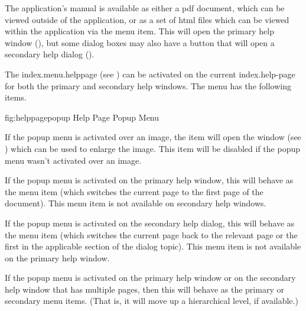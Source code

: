 
The application's manual is available as either a \gls{pdf}
document, which can be viewed outside of the application, or as a
set of \gls{html} files which can be viewed within the application
via the  menu item. This will open the primary
help window (), but some dialog boxes
may also have a  button that will open a secondary help
dialog ().


The \gls{index.menu.helppage} (see )
can be activated on the current \gls{index.help-page} for both the primary and
secondary help windows. The menu has the following items.

\FloatFig
{fig:helppagepopup}
{%
}
{Help Page Popup Menu}


If the popup menu is activated over an image, the 
item will open the  window (see
) which can be used to enlarge the
image. This item will be disabled if the popup menu wasn't activated
over an image.


If the popup menu is activated on the primary help window, this will
behave as the  menu item (which
switches the current page to the first page of the document).
This menu item is not available on secondary help windows.


If the popup menu is activated on the secondary help dialog, this
will behave as the  menu item
(which switches the current page back to the relevant page or the
first in the applicable section of the dialog topic).
This menu item is not available on the primary help window.


If the popup menu is activated on the primary help window or on the
secondary help window that has multiple pages, then this will behave
as the primary  or
secondary  menu items. (That is, it
will move up a hierarchical level, if available.)

